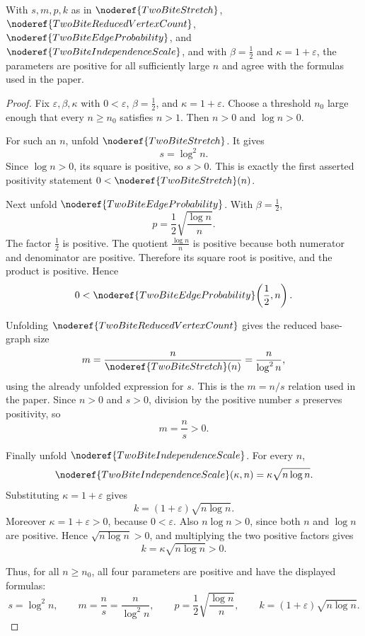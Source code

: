 \begin{lemma}
With \(s,m,p,k\) as in
\(\noderef{TwoBiteStretch}\), \(\noderef{TwoBiteReducedVertexCount}\),
\(\noderef{TwoBiteEdgeProbability}\), and
\(\noderef{TwoBiteIndependenceScale}\), and with
\(\beta=\frac12\) and \(\kappa=1+\varepsilon\), the parameters are positive for
all sufficiently large \(n\) and agree with the formulas used in the paper.
\end{lemma}
\begin{proof}
Fix \(\varepsilon,\beta,\kappa\) with \(0<\varepsilon\),
\(\beta=\frac12\), and \(\kappa=1+\varepsilon\).  Choose a threshold \(n_0\)
large enough that every \(n\ge n_0\) satisfies \(n>1\).  Then \(n>0\) and
\(\log n>0\).

For such an \(n\), unfold \(\noderef{TwoBiteStretch}\).  It gives
\[
s=\log^2 n.
\]
Since \(\log n>0\), its square is positive, so \(s>0\).  This is exactly the
first asserted positivity statement \(0<\noderef{TwoBiteStretch}(n)\).

Next unfold \(\noderef{TwoBiteEdgeProbability}\).  With \(\beta=\frac12\),
\[
p=\frac12\sqrt{\frac{\log n}{n}}.
\]
The factor \(\frac12\) is positive.  The quotient \(\frac{\log n}{n}\) is
positive because both numerator and denominator are positive.  Therefore its
square root is positive, and the product is positive.  Hence
\[
0<\noderef{TwoBiteEdgeProbability}\!\left(\frac12,n\right).
\]

Unfolding \(\noderef{TwoBiteReducedVertexCount}\) gives the reduced base-graph
size
\[
m=\frac{n}{\noderef{TwoBiteStretch}(n)}
  =\frac{n}{\log^2 n},
\]
using the already unfolded expression for \(s\).  This is the \(m=n/s\)
relation used in the paper.  Since \(n>0\) and \(s>0\), division by the
positive number \(s\) preserves positivity, so
\[
m=\frac ns>0.
\]

Finally unfold \(\noderef{TwoBiteIndependenceScale}\).  For every \(n\),
\[
\noderef{TwoBiteIndependenceScale}(\kappa,n)
  =\kappa\sqrt{n\log n}.
\]
Substituting \(\kappa=1+\varepsilon\) gives
\[
k=(1+\varepsilon)\sqrt{n\log n}.
\]
Moreover \(\kappa=1+\varepsilon>0\), because \(0<\varepsilon\).  Also
\(n\log n>0\), since both \(n\) and \(\log n\) are positive.  Hence
\(\sqrt{n\log n}>0\), and multiplying the two positive factors gives
\[
k=\kappa\sqrt{n\log n}>0.
\]

Thus, for all \(n\ge n_0\), all four parameters are positive and have the
displayed formulas:
\[
s=\log^2 n,\qquad
m=\frac{n}{s}=\frac{n}{\log^2 n},\qquad
p=\frac12\sqrt{\frac{\log n}{n}},\qquad
k=(1+\varepsilon)\sqrt{n\log n}.
\]
\end{proof}
